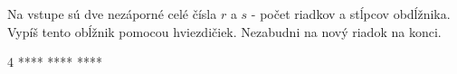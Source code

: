 




Na vstupe sú dve nezáporné celé čísla $r$ a $s$ - počet riadkov a stĺpcov obdĺžnika. Vypíš tento obĺžnik pomocou hviezdičiek.
Nezabudni na nový riadok na konci.

 4
\vystup
****
****
****
\koniec


